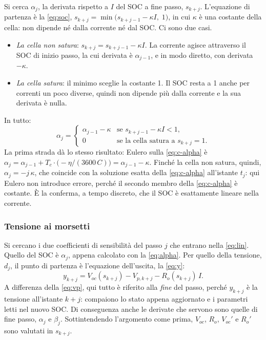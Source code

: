 \documentclass[11pt,a4paper]{article}
\newcommand{\Tc}{T_c}
\begin{document}
Si cerca $\alpha_j$, la derivata rispetto a $I$ del SOC a fine passo,
$s_{k+j}$. L'equazione di partenza è la \eqref{eq:soc},
$s_{k+j} = \min\bigl(s_{k+j-1} - \kappa I,\; 1\bigr)$, in cui $\kappa$ è una
costante della cella: non dipende né dalla corrente né dal SOC. Ci sono due
casi.
\begin{itemize}
  \item \emph{La cella non satura}: $s_{k+j} = s_{k+j-1} - \kappa I$. La
        corrente agisce attraverso il SOC di inizio passo, la cui derivata è
        $\alpha_{j-1}$, e in modo diretto, con derivata $-\kappa$.
  \item \emph{La cella satura}: il minimo sceglie la costante 1. Il SOC resta
        a 1 anche per correnti un poco diverse, quindi non dipende più dalla
        corrente e la sua derivata è nulla.
\end{itemize}
In tutto:
\begin{equation}
  \alpha_j =
  \begin{cases}
    \alpha_{j-1} - \kappa & \text{se } s_{k+j-1} - \kappa I < 1,\\[2pt]
    0 & \text{se la cella satura a } s_{k+j} = 1 .
  \end{cases}
  \label{eq:alpha}
\end{equation}
La prima strada dà lo stesso risultato: Eulero sulla \eqref{eq:c-alpha} è
$\alpha_j = \alpha_{j-1} + \Tc \cdot \bigl(-\eta/(3600\,C)\bigr)
= \alpha_{j-1} - \kappa$. Finché la cella non satura, quindi,
$\alpha_j = -j\,\kappa$, che coincide con la soluzione esatta della
\eqref{eq:c-alpha} all'istante $t_j$: qui Eulero non introduce errore, perché
il secondo membro della \eqref{eq:c-alpha} è costante. È la conferma, a tempo
discreto, che il SOC è esattamente lineare nella corrente.

\subsubsection{Tensione ai morsetti}

Si cercano i due coefficienti di sensibilità del passo $j$ che entrano nella
\eqref{eq:lin}. Quello del SOC è $\alpha_j$, appena calcolato con la
\eqref{eq:alpha}. Per quello della tensione, $d_j$, il punto di partenza è
l'equazione dell'uscita, la \eqref{eq:y}:
\[
  y_{k+j} = V_{oc}(s_{k+j}) - V_{p,k+j} - R_o(s_{k+j})\, I .
\]
A differenza della \eqref{eq:vp}, qui tutto è riferito alla \emph{fine} del
passo, perché $y_{k+j}$ è la tensione all'istante $k+j$: compaiono lo stato
appena aggiornato e i parametri letti nel nuovo SOC. Di conseguenza anche le
derivate che servono sono quelle di fine passo, $\alpha_j$ e $\beta_j$.
Sottintendendo l'argomento come prima, $V_{oc}$, $R_o$, $V_{oc}'$ e $R_o'$ sono
valutati in $s_{k+j}$.
\end{document}
